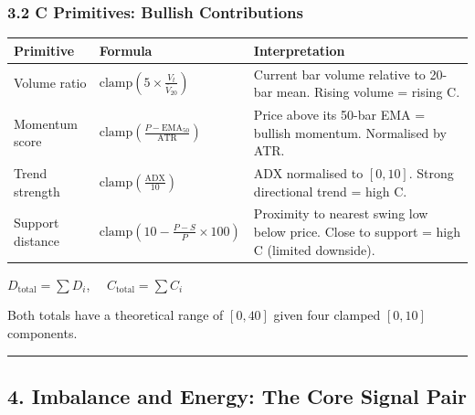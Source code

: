 \documentclass[
  11pt,
  letterpaper,
]{article}
\begin{document}
\subsubsection{3.2 C Primitives: Bullish
Contributions}\label{c-primitives-bullish-contributions}

\begin{longtable}[]{@{}
  >{\raggedright\arraybackslash}p{}
  >{\raggedright\arraybackslash}p{}
  >{\raggedright\arraybackslash}p{}@{}}
\toprule\noalign{}
\begin{minipage}[b]{\linewidth}\raggedright
Primitive
\end{minipage} & \begin{minipage}[b]{\linewidth}\raggedright
Formula
\end{minipage} & \begin{minipage}[b]{\linewidth}\raggedright
Interpretation
\end{minipage} \\
\midrule\noalign{}
\endhead
\bottomrule\noalign{}
\endlastfoot
Volume ratio &
\(\text{clamp}\!\left(5 \times \frac{V_t}{\bar{V}_{20}}\right)\) &
Current bar volume relative to 20-bar mean. Rising volume = rising C. \\
Momentum score &
\(\text{clamp}\!\left(\frac{P - \text{EMA}_{50}}{\text{ATR}}\right)\) &
Price above its 50-bar EMA = bullish momentum. Normalised by ATR. \\
Trend strength & \(\text{clamp}\!\left(\frac{\text{ADX}}{10}\right)\) &
ADX normalised to \([0, 10]\). Strong directional trend = high C. \\
Support distance &
\(\text{clamp}\!\left(10 - \frac{P - S}{P} \times 100\right)\) &
Proximity to nearest swing low below price. Close to support = high C
(limited downside). \\
\end{longtable}

\(D_{\text{total}} = \sum D_i\), \(\quad C_{\text{total}} = \sum C_i\)

Both totals have a theoretical range of \([0, 40]\) given four clamped
\([0, 10]\) components.

\begin{center}\rule{0.5\linewidth}{0.5pt}\end{center}

\subsection{4. Imbalance and Energy: The Core Signal
Pair}\label{imbalance-and-energy-the-core-signal-pair}
\end{document}

